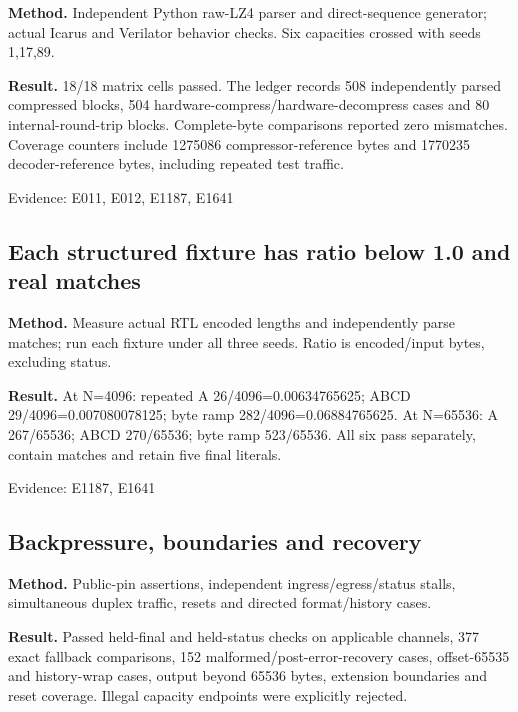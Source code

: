 \documentclass[11pt,a4paper]{article}
\begin{document}
\textbf{Method.} Independent Python raw-LZ4 parser and direct-sequence generator; actual Icarus and Verilator behavior checks. Six capacities crossed with seeds 1,\allowbreak{}17,\allowbreak{}89.

\textbf{Result.} 18/\allowbreak{}18 matrix cells passed. The ledger records 508 independently parsed compressed blocks,\allowbreak{} 504 hardware-compress/\allowbreak{}hardware-decompress cases and 80 internal-round-trip blocks. Complete-byte comparisons reported zero mismatches. Coverage counters include 1275086 compressor-reference bytes and 1770235 decoder-reference bytes,\allowbreak{} including repeated test traffic.

{\small Evidence: E011,\allowbreak{} E012,\allowbreak{} E1187,\allowbreak{} E1641}

\subsection{Each structured fixture has ratio below 1.0 and real matches}

\textbf{Method.} Measure actual RTL encoded lengths and independently parse matches; run each fixture under all three seeds. Ratio is encoded/\allowbreak{}input bytes,\allowbreak{} excluding status.

\textbf{Result.} At N=\allowbreak{}4096: repeated A 26/\allowbreak{}4096=\allowbreak{}0.00634765625; ABCD 29/\allowbreak{}4096=\allowbreak{}0.007080078125; byte ramp 282/\allowbreak{}4096=\allowbreak{}0.06884765625. At N=\allowbreak{}65536: A 267/\allowbreak{}65536; ABCD 270/\allowbreak{}65536; byte ramp 523/\allowbreak{}65536. All six pass separately,\allowbreak{} contain matches and retain five final literals.

{\small Evidence: E1187,\allowbreak{} E1641}

\subsection{Backpressure,\allowbreak{} boundaries and recovery}

\textbf{Method.} Public-pin assertions,\allowbreak{} independent ingress/\allowbreak{}egress/\allowbreak{}status stalls,\allowbreak{} simultaneous duplex traffic,\allowbreak{} resets and directed format/\allowbreak{}history cases.

\textbf{Result.} Passed held-final and held-status checks on applicable channels,\allowbreak{} 377 exact fallback comparisons,\allowbreak{} 152 malformed/\allowbreak{}post-error-recovery cases,\allowbreak{} offset-65535 and history-wrap cases,\allowbreak{} output beyond 65536 bytes,\allowbreak{} extension boundaries and reset coverage. Illegal capacity endpoints were explicitly rejected.
\end{document}
